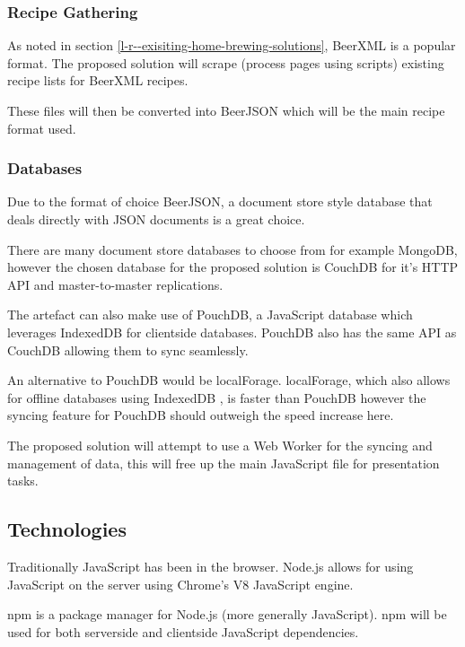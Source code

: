 \subsubsection{Recipe Gathering} \label{a-d--d--recipe-gathering}

As noted in section \ref{l-r--exisiting-home-brewing-solutions}, BeerXML is a popular format.
The proposed solution will scrape (process pages using scripts) existing recipe lists for BeerXML recipes.

These files will then be converted into BeerJSON which will be the main recipe format used.

\subsubsection{Databases} \label{a-d--d--databases}

Due to the format of choice BeerJSON, a document store style database that deals directly with JSON documents is a great choice.

There are many document store databases to choose from for example MongoDB, however the chosen database for the proposed solution is CouchDB for it's HTTP API and master-to-master replications. \cite{couchdb} %

The artefact can also make use of PouchDB, a JavaScript database which leverages IndexedDB for clientside databases. PouchDB also has the same API as CouchDB allowing them to sync seamlessly.

An alternative to PouchDB would be localForage. localForage, which also allows for offline databases using IndexedDB , is faster than PouchDB however the syncing feature for PouchDB should outweigh the speed increase here. %

The proposed solution will attempt to use a Web Worker for the syncing and management of data, this will free up the main JavaScript file for presentation tasks.

\subsection{Technologies} \label{a-d--technologies}

Traditionally JavaScript has been in the browser. Node.js allows for using JavaScript on the server using Chrome's V8 JavaScript engine. \cite{node.js}

npm is a package manager for Node.js (more generally JavaScript). npm will be used for both serverside and clientside JavaScript dependencies.

